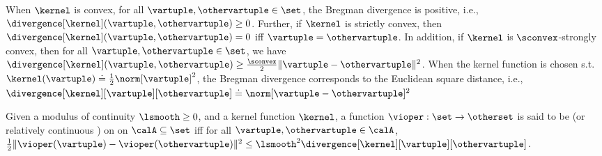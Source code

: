 When $\kernel$ is convex, for all $\vartuple, \othervartuple \in \set$, the Bregman divergence is positive, i.e., $\divergence[\kernel](\vartuple, \othervartuple) \geq 0$. Further, if $\kernel$ is strictly convex, then $\divergence[\kernel](\vartuple, \othervartuple) = 0$ iff $\vartuple = \othervartuple$. In addition, if $\kernel$ is $\sconvex$-strongly convex, then for all $\vartuple, \othervartuple \in \set$, we have $\divergence[\kernel](\vartuple, \othervartuple) \geq \frac{\sconvex}{2} \| \vartuple - \othervartuple\|^2$. When the kernel function is chosen s.t. $\kernel(\vartuple) \doteq \frac{1}{2}\norm[\vartuple]^2$, the Bregman divergence corresponds to the Euclidean square distance, i.e., $\divergence[\kernel][\vartuple][{\othervartuple}] \doteq \norm[{\vartuple - \othervartuple}]^2$

Given a modulus of continuity $\lsmooth \geq 0$, and a kernel function $\kernel$, a function $\vioper: \set \to \otherset$ is said to be  (or relatively continuous \cite{lu2019relative}) on on $\calA \subseteq \set$ iff for all $\vartuple, \othervartuple \in \calA$,  $\frac{1}{2}\|\vioper(\vartuple) - \vioper(\othervartuple)\|^2 \leq \lsmooth^2 \divergence[\kernel][{\vartuple}][{\othervartuple}]$.